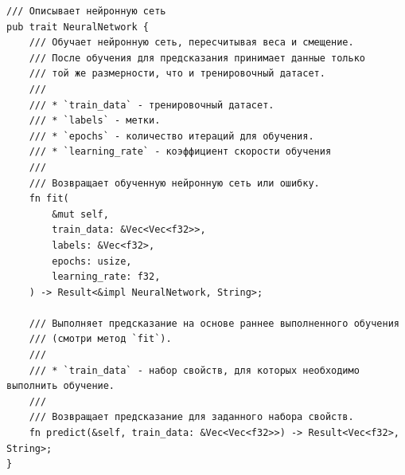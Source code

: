 \documentclass[a4paper,14pt]{extarticle}
\begin{document}
\begin{verbatim}
/// Описывает нейронную сеть
pub trait NeuralNetwork {
    /// Обучает нейронную сеть, пересчитывая веса и смещение.
    /// После обучения для предсказания принимает данные только
    /// той же размерности, что и тренировочный датасет.
    ///
    /// * `train_data` - тренировочный датасет.
    /// * `labels` - метки.
    /// * `epochs` - количество итераций для обучения.
    /// * `learning_rate` - коэффициент скорости обучения
    ///
    /// Возвращает обученную нейронную сеть или ошибку.
    fn fit(
        &mut self,
        train_data: &Vec<Vec<f32>>,
        labels: &Vec<f32>,
        epochs: usize,
        learning_rate: f32,
    ) -> Result<&impl NeuralNetwork, String>;

    /// Выполняет предсказание на основе раннее выполненного обучения
    /// (смотри метод `fit`).
    ///
    /// * `train_data` - набор свойств, для которых необходимо выполнить обучение.
    ///
    /// Возвращает предсказание для заданного набора свойств.
    fn predict(&self, train_data: &Vec<Vec<f32>>) -> Result<Vec<f32>, String>;
} 
\end{verbatim}
\end{document}
